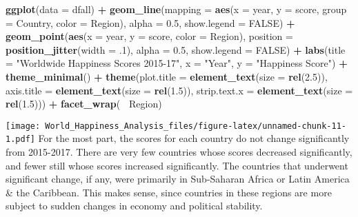 \documentclass[]{article}
\newenvironment{Shaded}{\begin{snugshade}}{\end{snugshade}}
\newcommand{\DataTypeTok}[1]{\textcolor[rgb]{0.13,0.29,0.53}{#1}}
\newcommand{\FloatTok}[1]{\textcolor[rgb]{0.00,0.00,0.81}{#1}}
\newcommand{\KeywordTok}[1]{\textcolor[rgb]{0.13,0.29,0.53}{\textbf{#1}}}
\newcommand{\NormalTok}[1]{#1}
\newcommand{\OperatorTok}[1]{\textcolor[rgb]{0.81,0.36,0.00}{\textbf{#1}}}
\newcommand{\OtherTok}[1]{\textcolor[rgb]{0.56,0.35,0.01}{#1}}
\newcommand{\StringTok}[1]{\textcolor[rgb]{0.31,0.60,0.02}{#1}}
\begin{document}
\begin{Shaded}
\begin{Highlighting}[]
\KeywordTok{ggplot}\NormalTok{(}\DataTypeTok{data =}\NormalTok{ dfall) }\OperatorTok{+}
\StringTok{  }\KeywordTok{geom_line}\NormalTok{(}\DataTypeTok{mapping =} \KeywordTok{aes}\NormalTok{(}\DataTypeTok{x =}\NormalTok{ year, }\DataTypeTok{y =}\NormalTok{ score, }\DataTypeTok{group =}\NormalTok{ Country, }
                          \DataTypeTok{color =}\NormalTok{ Region),}
            \DataTypeTok{alpha =} \FloatTok{0.5}\NormalTok{, }\DataTypeTok{show.legend =} \OtherTok{FALSE}\NormalTok{) }\OperatorTok{+}
\StringTok{  }\KeywordTok{geom_point}\NormalTok{(}\KeywordTok{aes}\NormalTok{(}\DataTypeTok{x =}\NormalTok{ year, }\DataTypeTok{y =}\NormalTok{ score, }\DataTypeTok{color =}\NormalTok{ Region), }
             \DataTypeTok{position =} \KeywordTok{position_jitter}\NormalTok{(}\DataTypeTok{width =} \FloatTok{.1}\NormalTok{),}
             \DataTypeTok{alpha =} \FloatTok{0.5}\NormalTok{,}
             \DataTypeTok{show.legend =} \OtherTok{FALSE}\NormalTok{) }\OperatorTok{+}
\StringTok{  }\KeywordTok{labs}\NormalTok{(}\DataTypeTok{title =} \StringTok{"Worldwide Happiness Scores 2015-17"}\NormalTok{, }
       \DataTypeTok{x =} \StringTok{"Year"}\NormalTok{, }
       \DataTypeTok{y =} \StringTok{"Happiness Score"}\NormalTok{) }\OperatorTok{+}
\StringTok{  }\KeywordTok{theme_minimal}\NormalTok{() }\OperatorTok{+}
\StringTok{  }\KeywordTok{theme}\NormalTok{(}\DataTypeTok{plot.title =} \KeywordTok{element_text}\NormalTok{(}\DataTypeTok{size =} \KeywordTok{rel}\NormalTok{(}\FloatTok{2.5}\NormalTok{)),}
        \DataTypeTok{axis.title =} \KeywordTok{element_text}\NormalTok{(}\DataTypeTok{size =} \KeywordTok{rel}\NormalTok{(}\FloatTok{1.5}\NormalTok{)),}
        \DataTypeTok{strip.text.x =} \KeywordTok{element_text}\NormalTok{(}\DataTypeTok{size =} \KeywordTok{rel}\NormalTok{(}\FloatTok{1.5}\NormalTok{))) }\OperatorTok{+}
\StringTok{  }\KeywordTok{facet_wrap}\NormalTok{(}\OperatorTok{~}\StringTok{ }\NormalTok{Region)}
\end{Highlighting}
\end{Shaded}

\texttt{[image: World\_Happiness\_Analysis\_files/figure-latex/unnamed-chunk-11-1.pdf]}
For the most part, the scores for each country do not change
significantly from 2015-2017. There are very few countries whose scores
decreased significantly, and fewer still whose scores increased
significantly. The countries that underwent significant change, if any,
were primarily in Sub-Saharan Africa or Latin America \& the Caribbean.
This makes sense, since countries in these regions are more subject to
sudden changes in economy and political stability.
\end{document}
